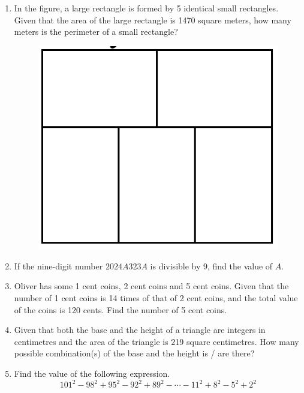 \documentclass[11pt]{scrartcl}
\begin{document}
\begin{enumerate}
    \vspace{10cm}\item In the figure, a large rectangle is formed by 5 identical small rectangles. Given that the area of the large rectangle is 1470 square meters, how many meters is the perimeter of a small rectangle?
    \begin{figure}[h]
        \centering
        \includegraphics{StarGen/AIMO Trial G3-4 2024/5rect.png}
    \end{figure}
    
    \vspace{10cm}\item If the nine-digit number $2024A323A$ is divisible by 9, find the value of $A$.
    
    \vspace{10cm}\item Oliver has some 1 cent coins, 2 cent coins and 5 cent coins. Given that the number of 1 cent coins is 14 times of that of 2 cent coins, and the total value of the coins is 120 cents. Find the number of 5 cent coins.

    \vspace{10cm}\item Given that both the base and the height of a triangle are integers in centimetres and the area of the triangle is 219 square centimetres. How many possible combination(s) of the base and the height is / are there?
    
    \vspace{10cm}\item Find the value of the following expression.
    \[101^2 - 98^2 + 95^2 - 92^2 + 89^2 - \cdots - 11^2 + 8^2 - 5^2 + 2^2\]
    

\end{enumerate}
\end{document}
